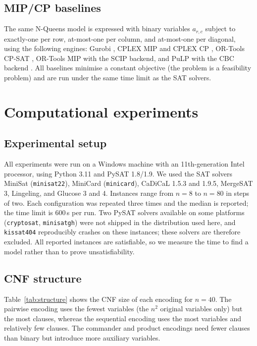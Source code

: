 \documentclass[a4paper,fleqn]{cas-sc}
\begin{document}
\subsection{MIP/CP baselines}
The same N-Queens model is expressed with binary variables $a_{r,c}$ subject to
exactly-one per row, at-most-one per column, and at-most-one per diagonal, using
the following engines: Gurobi \citep{Gurobi2024}, CPLEX MIP and CPLEX CP
\citep{IBM2022}, OR-Tools CP-SAT \citep{ORtools2023}, OR-Tools MIP with the SCIP
backend, and PuLP with the CBC backend \citep{ForrestCBC}. All baselines minimise
a constant objective (the problem is a feasibility problem) and are run under the
same time limit as the SAT solvers.

\section{Computational experiments}\label{sec:experiments}

\subsection{Experimental setup}
All experiments were run on a Windows machine with an 11th-generation Intel
processor, using Python 3.11 and PySAT 1.8/1.9. We used the SAT solvers MiniSat
(\texttt{minisat22}), MiniCard (\texttt{minicard}), CaDiCaL 1.5.3 and 1.9.5,
MergeSAT 3, Lingeling, and Glucose 3 and 4. Instances range from $n=8$ to $n=80$
in steps of two. Each configuration was repeated three times and the median is
reported; the time limit is 600\,s per run. Two PySAT solvers available on some
platforms (\texttt{cryptosat}, \texttt{minisatgh}) were not shipped in the
distribution used here, and \texttt{kissat404} reproducibly crashes on these
instances; these solvers are therefore excluded. All reported instances are
satisfiable, so we measure the time to find a model rather than to prove
unsatisfiability.

\subsection{CNF structure}
Table~\ref{tab:structure} shows the CNF size of each encoding for $n=40$. The
pairwise encoding uses the fewest variables (the $n^2$ original variables only)
but the most clauses, whereas the sequential encoding uses the most variables and
relatively few clauses. The commander and product encodings need fewer clauses
than binary but introduce more auxiliary variables.
\end{document}

